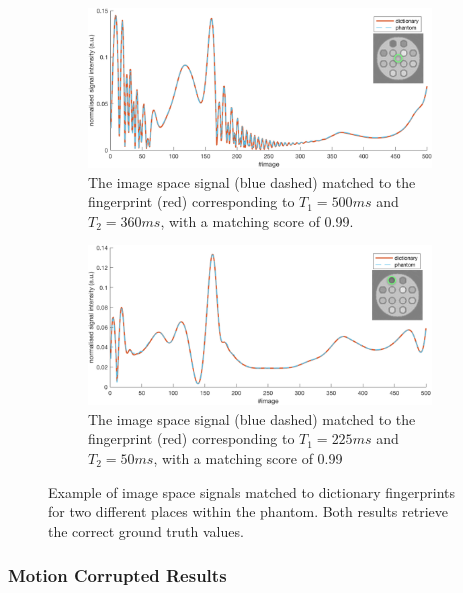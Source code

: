 \begin{figure}[ht]
    \centering
    \begin{subfigure}[b]{.75\textwidth}
        \includegraphics[width=\textwidth]{images/mrf/nomotionExampleSignalsa}
        \caption{The image space signal (blue dashed) matched to the fingerprint (red) corresponding to $T_1 = 500ms$ and $T_2 = 360ms$, with a matching score of 0.99.}
    \end{subfigure}
    
    \begin{subfigure}[b]{.75\textwidth}
        \includegraphics[width=\textwidth]{images/mrf/nomotionExampleSignalsb}
        \caption{The image space signal (blue dashed) matched to the fingerprint (red) corresponding to $T_1 = 225ms$ and $T_2 = 50ms$, with a matching score of 0.99}
    \end{subfigure}
    
    \caption{Example of image space signals matched to dictionary fingerprints for two different places within the phantom.
    Both results retrieve the correct ground truth values.}
    \label{fig:nomotionExampleSignals}
\end{figure}

\hfill

\subsubsection{Motion Corrupted Results}

